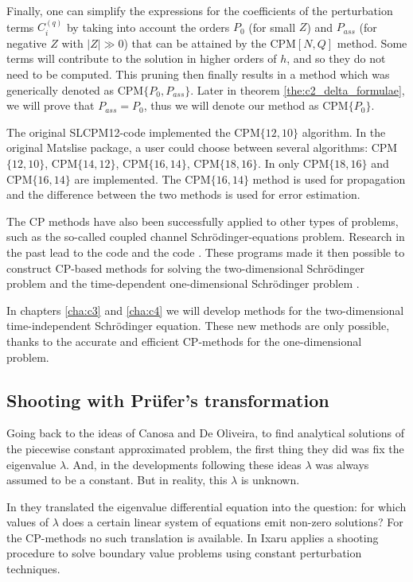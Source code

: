 Finally, one can simplify the expressions for the coefficients of the perturbation terms $C^{(q)}_i$ by taking into account the orders $P_0$ (for small $Z$) and $P_{ass}$ (for negative $Z$ with $|Z| \gg 0$) that can be attained by the CPM$[N,Q]$ method. Some terms will contribute to the solution in higher orders of $h$, and so they do not need to be computed. This pruning then finally results in a method which was generically denoted as CPM$\{P_0, P_{ass}\}$. Later in theorem \ref{the:c2_delta_formulae}, we will prove that $P_{ass} = P_0$, thus we will denote our method as CPM$\{P_0\}$.

The original SLCPM12-code implemented the CPM$\{12,10\}$ algorithm. In the original Matslise package, a user could choose between several algorithms: CPM$\{12,10\}$, CPM$\{14,12\}$, CPM$\{16,14\}$, CPM$\{18,16\}$.
In  only CPM$\{18,16\}$ and CPM$\{16,14\}$ are implemented. The CPM$\{16,14\}$ method is used for propagation and the difference between the two methods is used for error estimation.

The CP methods have also been successfully applied to other types of problems, such as the so-called coupled channel Schrödinger-equations problem. Research in the past lead to the \fortran{} code \lilix{} \cite{ixaru_lilix_2002} and the \matlab{} code \matscs{} \cite{ledoux_numerical_2007}. These programs made it then possible to construct CP-based methods for solving the two-dimensional Schrödinger problem \cite{ixaru_new_2010} and the time-dependent one-dimensional Schrödinger problem \cite{ledoux_accurate_2014}.

In chapters \ref{cha:c3} and \ref{cha:c4} we will develop methods for the two-dimensional time-independent Schrödinger equation. These new methods are only possible, thanks to the accurate and efficient CP-methods for the one-dimensional problem.

\subsection{Shooting with Prüfer's transformation}\label{sec:c2_shooting_prufer}

Going back to the ideas of Canosa and De Oliveira, to find analytical solutions of the piecewise constant approximated problem, the first thing they did was fix the eigenvalue $\lambda$. And, in the developments following these ideas $\lambda$ was always assumed to be a constant. But in reality, this $\lambda$ is unknown.

In \cite{canosa_new_1970} they translated the eigenvalue differential equation into the question: for which values of $\lambda$ does a certain linear system of equations emit non-zero solutions? For the CP-methods no such translation is available. In \cite{ixaru_numerical_1984} Ixaru applies a shooting procedure to solve boundary value problems using constant perturbation techniques.


